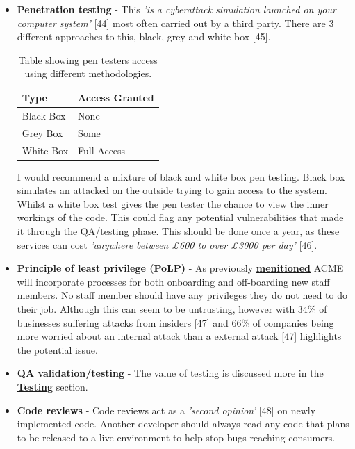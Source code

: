   \begin{itemize}
    \item \textbf{Penetration testing} - This \textit{'is a cyberattack simulation launched on your computer system'} [44] most often carried out by a
    third party. There are 3 different approaches to this, black, grey and white box [45].

    \begin{table}[H]
      \centering
      \begin{tabular}{|l|l|}
        \hline
        \textbf{Type} & \textbf{Access Granted}   \\ \hline
        Black Box     & None                      \\ \hline
        Grey Box      & Some                      \\ \hline
        White Box     & Full Access               \\ \hline
      \end{tabular}
      \caption{Table showing pen testers access using different methodologies.}
    \end{table}

    I would recommend a mixture of black and white box pen testing. Black box simulates an attacked on the outside trying to gain access to the system.
    Whilst a white box test gives the pen tester the chance to view the inner workings of the code. This could flag any potential vulnerabilities that 
    made it through the QA/testing phase. This should be done once a year, as these services can cost 
    \textit{'anywhere between £600 to over £3000 per day'} [46].

    \item \textbf{Principle of least privilege (PoLP)} - As previously \hyperref[sec:PoLP]{\textbf{menitioned}} ACME will incorporate processes for 
    both onboarding and off-boarding new staff members. No staff member should have any privileges they do not need to do their job. Although this can seem 
    to be untrusting, however with 34\% of businesses suffering attacks from insiders [47] and 66\% of companies being more worried about an internal attack 
    than a external attack [47] highlights the potential issue.

    \item \textbf{QA validation/testing} - The value of testing is discussed more in the \hyperref[sec:Testing]{\textbf{Testing}} section.
    
    \item \textbf{Code reviews} - Code reviews act as a \textit{'second opinion'} [48] on newly implemented code. Another developer should always read any 
    code that plans to be released to a live environment to help stop bugs reaching consumers.


\end{itemize}

